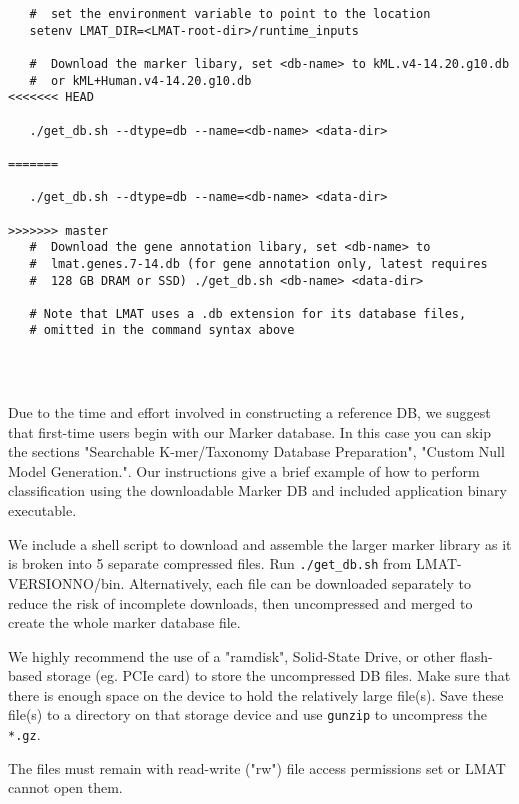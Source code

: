 \documentclass[11pt]{article}
\newcommand{\lmatver}{VERSIONNO}
\begin{document}
\begin{enumerate}[A.]
{\begin{verbatim}
   #  set the environment variable to point to the location
   setenv LMAT_DIR=<LMAT-root-dir>/runtime_inputs

   #  Download the marker libary, set <db-name> to kML.v4-14.20.g10.db 
   #  or kML+Human.v4-14.20.g10.db
<<<<<<< HEAD

   ./get_db.sh --dtype=db --name=<db-name> <data-dir>

=======

   ./get_db.sh --dtype=db --name=<db-name> <data-dir>

>>>>>>> master
   #  Download the gene annotation libary, set <db-name> to
   #  lmat.genes.7-14.db (for gene annotation only, latest requires
   #  128 GB DRAM or SSD) ./get_db.sh <db-name> <data-dir>

   # Note that LMAT uses a .db extension for its database files,
   # omitted in the command syntax above




\end{verbatim}     
         
     Due to the time and effort involved in constructing a reference
     DB, we suggest that first-time users begin with our Marker
     database.  In this case you can skip the sections "Searchable
     K-mer/Taxonomy Database Preparation", "Custom Null Model
     Generation.".  Our  instructions give a
     brief example of how to perform classification using the
     downloadable Marker DB and included application binary
     executable.

     We include a shell script to download and assemble the larger
     marker library as it is broken into 5 separate compressed files.
     Run \texttt{./get\_db.sh} from LMAT-\lmatver/bin.
     Alternatively, each file can be downloaded separately to reduce
     the risk of incomplete downloads, then uncompressed and merged to
     create the whole marker database file.
        
     We highly recommend the use of a "ramdisk", Solid-State Drive, or
     other flash-based storage (eg. PCIe card) to store the
     uncompressed DB files.  Make sure that there is enough space on
     the device to hold the relatively large file(s).  Save these
     file(s) to a directory on that storage device and use
     \texttt{gunzip} to uncompress the \texttt{*.gz}.

     The files must remain with read-write ("rw") file access
     permissions set or LMAT cannot open them.

}
\end{enumerate}
\end{document}
